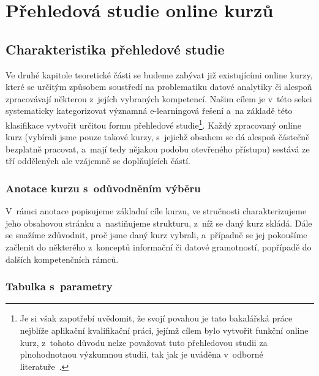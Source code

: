 \hypertarget{pux159ehledovuxe1-studie-online-kurzux16f}{%
\chapter{Přehledová studie online kurzů}\label{pux159ehledovuxe1-studie-online-kurzux16f}}

\hypertarget{charakteristika-pux159ehledovuxe9-studie}{%
\section{Charakteristika přehledové studie}\label{charakteristika-pux159ehledovuxe9-studie}}

Ve druhé kapitole teoretické části se budeme zabývat již existujícími online kurzy, které se určitým způsobem soustředí na problematiku datové analytiky či alespoň zpracovávají některou z~jejích vybraných kompetencí. Našim cílem je v~této sekci systematicky kategorizovat významná e-learningová řešení a~na základě této klasifikace vytvořit určitou formu přehledové studie\footnote{Je si však zapotřebí uvědomit, že svojí povahou je tato bakalářská práce nejblíže aplikační kvalifikační práci, jejímž cílem bylo vytvořit funkční online kurz, z~tohoto důvodu nelze považovat tuto přehledovou studii za plnohodnotnou výzkumnou studii, tak jak je uváděna v~odborné literatuře~\parencite{mares2013}.}. Každý zpracovaný online kurz (vybírali jsme pouze takové kurzy, s~jejichž obsahem se dá alespoň částečně bezplatně pracovat, a~mají tedy nějakou podobu otevřeného přístupu) sestává ze tří oddělených ale vzájemně se doplňujících částí.

\hypertarget{anotace-kurzu-s-odux16fvodnux11bnuxedm-vuxfdbux11bru}{%
\subsection{Anotace kurzu s~odůvodněním výběru}\label{anotace-kurzu-s-odux16fvodnux11bnuxedm-vuxfdbux11bru}}

V~rámci anotace popisujeme základní cíle kurzu, ve stručnosti charakterizujeme jeho obsahovou stránku a~nastiňujeme strukturu, z~níž se daný kurz skládá. Dále se snažíme zdůvodnit, proč jsme daný kurz vybrali, a~případně se jej pokoušíme začlenit do některého z~konceptů informační či datové gramotností, popřípadě do dalších kompetenčních rámců.

\hypertarget{tabulka-s-parametry}{%
\subsection{Tabulka s~parametry}\label{tabulka-s-parametry}}

